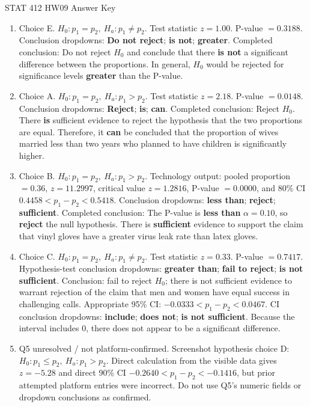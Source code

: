 \documentclass[11pt]{article}
\begin{document}
\raggedright
\begin{center}
{\Large STAT 412 HW09 Answer Key}
\end{center}

\begin{enumerate}[leftmargin=*]
\item Choice E. \(H_0:p_1=p_2,\ H_a:p_1\ne p_2\). Test statistic \(z=1.00\). P-value \(=0.3188\). Conclusion dropdowns: \textbf{Do not reject}; \textbf{is not}; \textbf{greater}. Completed conclusion: Do not reject \(H_0\) and conclude that there \textbf{is not} a significant difference between the proportions. In general, \(H_0\) would be rejected for significance levels \textbf{greater} than the P-value.

\item Choice A. \(H_0:p_1=p_2,\ H_a:p_1>p_2\). Test statistic \(z=2.18\). P-value \(=0.0148\). Conclusion dropdowns: \textbf{Reject}; \textbf{is}; \textbf{can}. Completed conclusion: Reject \(H_0\). There \textbf{is} sufficient evidence to reject the hypothesis that the two proportions are equal. Therefore, it \textbf{can} be concluded that the proportion of wives married less than two years who planned to have children is significantly higher.

\item Choice B. \(H_0:p_1=p_2,\ H_a:p_1>p_2\). Technology output: pooled proportion \(=0.36\), \(z=11.2997\), critical value \(z=1.2816\), P-value \(=0.0000\), and 80\% CI \(0.4458 < p_1-p_2 < 0.5418\). Conclusion dropdowns: \textbf{less than}; \textbf{reject}; \textbf{sufficient}. Completed conclusion: The P-value is \textbf{less than} \(\alpha=0.10\), so \textbf{reject} the null hypothesis. There is \textbf{sufficient} evidence to support the claim that vinyl gloves have a greater virus leak rate than latex gloves.

\item Choice C. \(H_0:p_1=p_2,\ H_a:p_1\ne p_2\). Test statistic \(z=0.33\). P-value \(=0.7417\). Hypothesis-test conclusion dropdowns: \textbf{greater than}; \textbf{fail to reject}; \textbf{is not sufficient}. Conclusion: fail to reject \(H_0\); there is not sufficient evidence to warrant rejection of the claim that men and women have equal success in challenging calls. Appropriate 95\% CI: \(-0.0333 < p_1-p_2 < 0.0467\). CI conclusion dropdowns: \textbf{include}; \textbf{does not}; \textbf{is not sufficient}. Because the interval includes 0, there does not appear to be a significant difference.

\item Q5 unresolved / not platform-confirmed. Screenshot hypothesis choice D: \(H_0:p_1\le p_2,\ H_a:p_1>p_2\). Direct calculation from the visible data gives \(z=-5.28\) and direct 90\% CI \(-0.2640 < p_1-p_2 < -0.1416\), but prior attempted platform entries were incorrect. Do not use Q5's numeric fields or dropdown conclusions as confirmed.


\end{enumerate}
\end{document}
